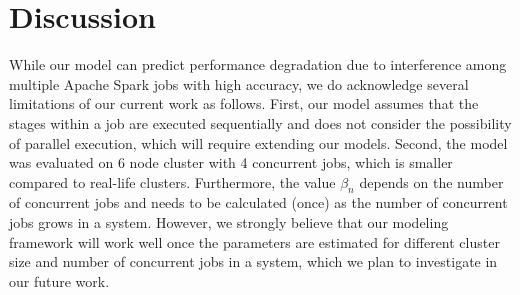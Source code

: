 \section{Discussion}
\label{discussion}
While our model can predict performance degradation due to interference among multiple Apache Spark jobs with high accuracy, we do acknowledge several limitations of our current work as follows. First, our model assumes that the stages within a job are executed sequentially and does not consider the possibility of parallel execution, which will require extending our models. Second, the model was evaluated on 6 node cluster with 4 concurrent jobs, which is smaller compared to real-life clusters. Furthermore, the value $\beta_{n}$ depends on the number of concurrent jobs and needs to be calculated (once) as the number of concurrent jobs grows in a system. However, we strongly believe that our modeling framework will work well once the parameters are estimated for different cluster size and number of concurrent jobs in a system, which we plan to investigate in our future work. 






